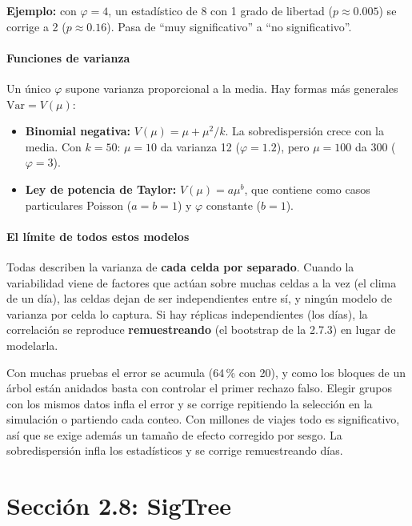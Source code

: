 \documentclass[11pt,a4paper]{article}
\newenvironment{idea}{\par\begin{center}\begin{lrbox}{\ideabox}\begin{minipage}{0.9\linewidth}}{\end{minipage}\end{lrbox}\fcolorbox{blue!40!black}{blue!5}{\usebox{\ideabox}}\end{center}}
\begin{document}
\textbf{Ejemplo:} con $\varphi=4$, un estadístico de 8 con 1 grado de libertad
($p\approx0.005$) se corrige a 2 ($p\approx0.16$). Pasa de ``muy significativo'' a
``no significativo''.

\subsection{Funciones de varianza}

Un único $\varphi$ supone varianza proporcional a la media. Hay formas más generales
$\mathrm{Var}=V(\mu)$:
\begin{itemize}
  \item \textbf{Binomial negativa:} $V(\mu)=\mu+\mu^2/k$. La sobredispersión crece
  con la media. Con $k=50$: $\mu=10$ da varianza 12 ($\varphi=1.2$), pero $\mu=100$
  da 300 ($\varphi=3$).
  \item \textbf{Ley de potencia de Taylor:} $V(\mu)=a\mu^b$, que contiene como casos
  particulares Poisson ($a=b=1$) y $\varphi$ constante ($b=1$).
\end{itemize}

\subsection{El límite de todos estos modelos}

Todas describen la varianza de \textbf{cada celda por separado}. Cuando la
variabilidad viene de factores que actúan sobre muchas celdas a la vez (el clima de
un día), las celdas dejan de ser independientes entre sí, y ningún modelo de
varianza por celda lo captura. Si hay réplicas independientes (los días), la
correlación se reproduce \textbf{remuestreando} (el bootstrap de la 2.7.3) en lugar
de modelarla.

\begin{idea}
Con muchas pruebas el error se acumula (64\,\% con 20), y como los bloques de un
árbol están anidados basta con controlar el primer rechazo falso. Elegir grupos con
los mismos datos infla el error y se corrige repitiendo la selección en la
simulación o partiendo cada conteo. Con millones de viajes todo es significativo,
así que se exige además un tamaño de efecto corregido por sesgo. La sobredispersión
infla los estadísticos y se corrige remuestreando días.
\end{idea}

\part{Sección 2.8: SigTree}
\end{document}
